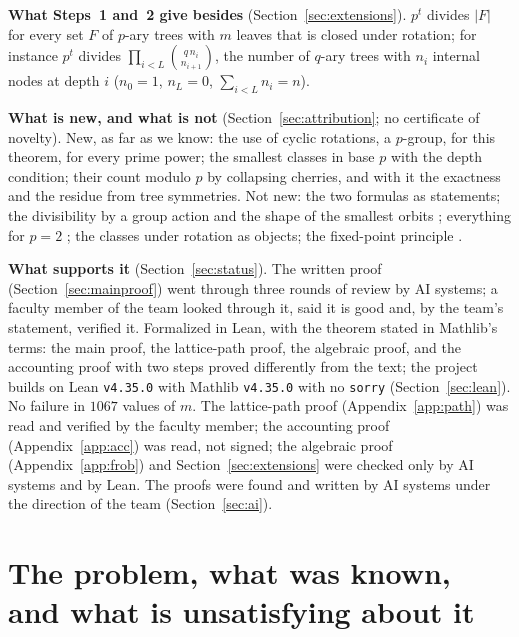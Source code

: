 \documentclass[11pt]{article}
\theoremstyle{definition}
\theoremstyle{remark}
\numberwithin{equation}{section}
\numberwithin{figure}{section}
\newcommand{\LeanVersions}{Lean \texttt{v4.35.0} with Mathlib \texttt{v4.35.0}}
\begin{document}
{\small %
\noindent\textbf{What Steps~1 and~2 give besides} (Section~\ref{sec:extensions}). $p^t$ divides $|F|$ for every
set $F$ of $p$-ary trees with $m$ leaves that is closed under rotation; for instance $p^t$ divides
$\prod_{i<L}\binom{q\,n_i}{n_{i+1}}$, the number of $q$-ary trees with $n_i$ internal nodes at depth $i$
($n_0=1$, $n_L=0$, $\sum_{i<L}n_i=n$).

\noindent\textbf{What is new, and what is not} (Section~\ref{sec:attribution}; no certificate of novelty). New,
as far as we know: the use of cyclic rotations, a $p$-group, for this theorem, for every prime power; the
smallest classes in base $p$ with the depth condition; their count modulo $p$ by collapsing cherries, and
with it the exactness and the residue from tree symmetries. Not new: the two formulas as statements; the
divisibility by a group action and the shape of the smallest orbits \cite{Konvalinka}; everything for $p=2$
\cite{Etherington,DeutschSagan,KerstingFischer}; the classes under rotation as objects; the fixed-point
principle \cite{Gessel}.

\noindent\textbf{What supports it} (Section~\ref{sec:status}). The written proof (Section~\ref{sec:mainproof})
went through three rounds of review by AI systems; a faculty member of the team looked through it, said it
is good and, by the team's statement, verified it. Formalized in Lean, with the theorem stated in Mathlib's
terms: the main proof, the lattice-path proof, the algebraic proof, and the accounting proof with two steps
proved differently from the text; the project builds on \LeanVersions{} with no \texttt{sorry}
(Section~\ref{sec:lean}). No failure in $1067$ values of $m$. The lattice-path proof
(Appendix~\ref{app:path}) was read and verified by the faculty member; the accounting proof
(Appendix~\ref{app:acc}) was read, not signed; the algebraic proof (Appendix~\ref{app:frob}) and
Section~\ref{sec:extensions} were checked only by AI systems and by Lean. The proofs were found and written
by AI systems under the direction of the team (Section~\ref{sec:ai}).\par}

\clearpage
\setcounter{tocdepth}{1}
\tableofcontents

\section{The problem, what was known, and what is unsatisfying about it}\label{sec:problem}
\end{document}
